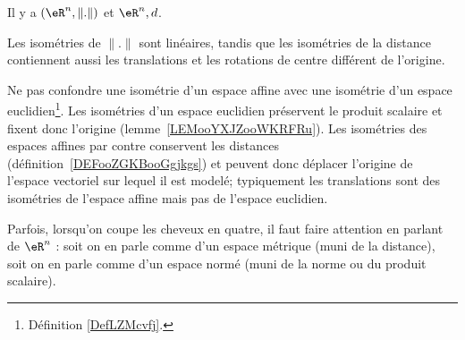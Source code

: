 
      \label{THMooVUCLooCrdbxm}

Il y a \( (\eR^n,\| . \|)\) et \( \eR^n,d\).

Les isométries de \( \| . \|\) sont linéaires, tandis que les isométries de la distance contiennent aussi les translations et les rotations de centre différent de l'origine.

Ne pas confondre une isométrie d'un espace affine avec une isométrie d'un espace euclidien\footnote{Définition \ref{DefLZMcvfj}.}. Les isométries d'un espace euclidien préservent le produit scalaire et fixent donc l'origine (lemme~\ref{LEMooYXJZooWKRFRu}). Les isométries des espaces affines par contre conservent les distances (définition~\ref{DEFooZGKBooGgjkgs}) et peuvent donc déplacer l'origine de l'espace vectoriel sur lequel il est modelé; typiquement les translations sont des isométries de l'espace affine mais pas de l'espace euclidien.

Parfois, lorsqu'on coupe les cheveux en quatre, il faut faire attention en parlant de \( \eR^n\) : soit on en parle comme d'un espace métrique (muni de la distance), soit on en parle comme d'un espace normé (muni de la norme ou du produit scalaire).

